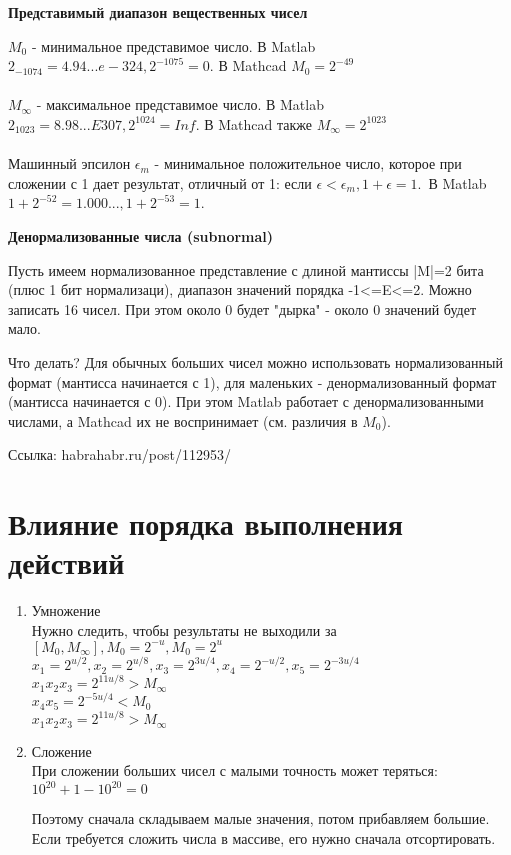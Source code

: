 \documentclass[a4paper,12pt]{report}
\begin{document}
\textbf{Представимый диапазон вещественных чисел}

$M_0$ - минимальное представимое число. В Matlab $2_{-1074}=4.94...e-324, 2^{-1075}=0$. В Mathcad $M_0=2^{-49}$\\ 
\\
$M_\infty$ - максимальное представимое число. В Matlab $2_{1023}=8.98...E307, 2^{1024}=Inf$. В Mathcad также $M_\infty=2^1023$\\
\\
Машинный эпсилон $\epsilon_m$ - минимальное положительное число, которое при сложении с 1 дает результат, отличный от 1: если $\epsilon<\epsilon_m, 1+\epsilon=1$. В Matlab $1+2^{-52}=1.000..., 1+2^{-53}=1$.

\textbf{Денормализованные числа (subnormal)}

Пусть имеем нормализованное представление с длиной мантиссы |M|=2 бита (плюс 1 бит нормализаци), диапазон значений порядка -1<=E<=2. Можно записать 16 чисел. При этом около 0 будет "дырка" - около 0 значений будет мало.

Что делать? Для обычных больших чисел можно использовать нормализованный формат (мантисса начинается с 1), для маленьких - денормализованный формат (мантисса начинается с 0). При этом Matlab работает с денормализованными числами, а Mathcad их не воспринимает (см. различия в $M_0$).

Ссылка: habrahabr.ru/post/112953/

\section{Влияние порядка выполнения действий}
\begin{enumerate}
\item Умножение\\
Нужно следить, чтобы результаты не выходили за $[M_0, M_\infty], M_0=2^{-u},  M_0=2^{u}$\\
$x_1=2^{u/2}, x_2=2^{u/8}, x_3=2^{3u/4}, x_4=2^{-u/2}, x_5=2^{-3u/4}$\\

$x_1x_2x_3=2^{11u/8}>M_\infty$\\
$x_4x_5=2^{-5u/4}<M_0$\\
$x_1x_2x_3=2^{11u/8}>M_\infty$\\

\item Сложение\\
При сложении больших чисел с малыми точность может теряться: $10^20+1-10^20=0$

Поэтому сначала складываем малые значения, потом прибавляем большие. Если требуется сложить числа в массиве, его нужно сначала отсортировать.
\end{enumerate}
\end{document}
